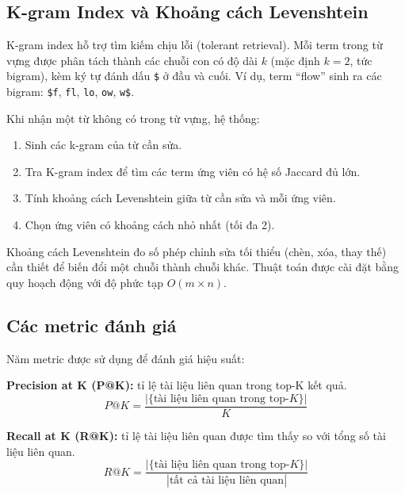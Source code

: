 \documentclass[12pt,a4paper,twoside]{article}
\begin{document}
\subsection{K-gram Index và Khoảng cách Levenshtein}

K-gram index hỗ trợ tìm kiếm chịu lỗi (tolerant retrieval). Mỗi term trong từ vựng được phân tách thành các chuỗi con có độ dài $k$ (mặc định $k = 2$, tức bigram), kèm ký tự đánh dấu \texttt{\$} ở đầu và cuối. Ví dụ, term ``flow'' sinh ra các bigram: \texttt{\$f}, \texttt{fl}, \texttt{lo}, \texttt{ow}, \texttt{w\$}.

Khi nhận một từ không có trong từ vựng, hệ thống:
\begin{enumerate}
    \item Sinh các k-gram của từ cần sửa.
    \item Tra K-gram index để tìm các term ứng viên có hệ số Jaccard đủ lớn.
    \item Tính khoảng cách Levenshtein giữa từ cần sửa và mỗi ứng viên.
    \item Chọn ứng viên có khoảng cách nhỏ nhất (tối đa 2).
\end{enumerate}

Khoảng cách Levenshtein đo số phép chỉnh sửa tối thiểu (chèn, xóa, thay thế) cần thiết để biến đổi một chuỗi thành chuỗi khác. Thuật toán được cài đặt bằng quy hoạch động với độ phức tạp $O(m \times n)$.

\subsection{Các metric đánh giá}

Năm metric được sử dụng để đánh giá hiệu suất:

\textbf{Precision at K (P@K):} tỉ lệ tài liệu liên quan trong top-K kết quả.
\begin{equation}
P@K = \frac{|\{\text{tài liệu liên quan trong top-}K\}|}{K}
\end{equation}

\textbf{Recall at K (R@K):} tỉ lệ tài liệu liên quan được tìm thấy so với tổng số tài liệu liên quan.
\begin{equation}
R@K = \frac{|\{\text{tài liệu liên quan trong top-}K\}|}{|\text{tất cả tài liệu liên quan}|}
\end{equation}
\end{document}
